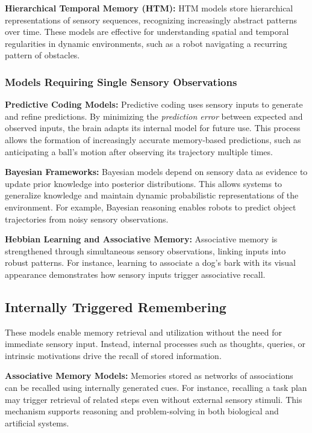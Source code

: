             \textbf{Hierarchical Temporal Memory (HTM):} HTM models store hierarchical representations of sensory sequences, recognizing increasingly abstract patterns over time. These models are effective for understanding spatial and temporal regularities in dynamic environments, such as a robot navigating a recurring pattern of obstacles. 

        \subsubsection{Models Requiring Single Sensory Observations}
            \textbf{Predictive Coding Models:} Predictive coding uses sensory inputs to generate and refine predictions. By minimizing the \textit{prediction error} between expected and observed inputs, the brain adapts its internal model for future use. This process allows the formation of increasingly accurate memory-based predictions, such as anticipating a ball’s motion after observing its trajectory multiple times. 

            \textbf{Bayesian Frameworks:} Bayesian models depend on sensory data as evidence to update prior knowledge into posterior distributions. This allows systems to generalize knowledge and maintain dynamic probabilistic representations of the environment. For example, Bayesian reasoning enables robots to predict object trajectories from noisy sensory observations. 

            \textbf{Hebbian Learning and Associative Memory:} Associative memory is strengthened through simultaneous sensory observations, linking inputs into robust patterns. For instance, learning to associate a dog’s bark with its visual appearance demonstrates how sensory inputs trigger associative recall. 

    \subsection{Internally Triggered Remembering}
    These models enable memory retrieval and utilization without the need for immediate sensory input. Instead, internal processes such as thoughts, queries, or intrinsic motivations drive the recall of stored information.

        \textbf{Associative Memory Models:} Memories stored as networks of associations can be recalled using internally generated cues. For instance, recalling a task plan may trigger retrieval of related steps even without external sensory stimuli. This mechanism supports reasoning and problem-solving in both biological and artificial systems. 


